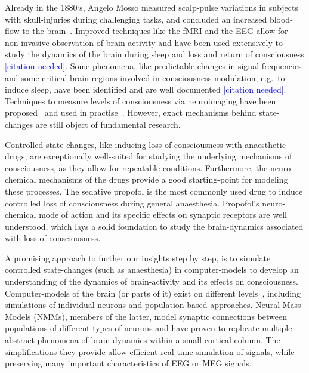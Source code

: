 Already in the 1880`s, Angelo Mosso measured scalp-pulse variations in subjects
with skull-injuries during challenging tasks,
and concluded an increased blood-flow to the brain~\cite{mosso_ueber_1881}.
Improved techniques like the fMRI and the EEG allow for non-invasive observation of brain-activity and have been
used extensively to study the dynamics of the brain during sleep and loss and return of consciousness
\textcolor{blue}{[citation needed]}.
Some phenomena, like predictable changes in signal-frequencies and some critical brain regions involved in
consciousness-modulation, e.g.\ to induce sleep, have been identified and are well documented
\textcolor{blue}{[citation
needed]}.
Techniques to measure levels of consciousness via neuroimaging have been proposed~\cite{sigl_introduction_1994,
    casali_theoretically_2013} and used in practise~\cite{mathur_bispectral_2022}.
However, exact mechanisms behind state-changes are still object of fundamental research.

Controlled state-changes, like inducing loss-of-consciousness with anaesthetic drugs,
are exceptionally well-suited for studying the underlying mechanisms of consciousness,
as they allow for repeatable conditions.
Furthermore, the neuro-chemical mechanisms of the drugs provide a good starting-point for modeling these processes.
The sedative propofol is the most commonly used drug to induce controlled loss of consciousness
during general anaesthesia.
Propofol's neuro-chemical mode of action and its specific effects on synaptic receptors are well understood,
which lays a solid foundation to study the brain-dynamics associated with loss of consciousness.


A promising approach to further our insights step by step, is to simulate controlled state-changes
(such as anaesthesia) in computer-models to develop an understanding of the dynamics of brain-activity and its
effects on consciousness. %
Computer-models of the brain (or parts of it) exist on different levels~\cite{panahi_generative_2021},
including simulations of individual neurons and population-based approaches.
Neural-Mass-Models (NMMs), members of the latter, model synaptic connections between populations of different types
of neurons and have proven to replicate multiple abstract phenomena of brain-dynamics\cite{bojak_neural_2014,
    knösche_jansen-rit_2014} within a small cortical
column.
The simplifications they provide allow efficient real-time simulation of signals,
while preserving many important characteristics of EEG or MEG signals.

